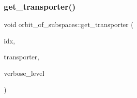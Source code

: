 \mbox{\label{classorbit__of__subspaces_a8a12bc95bd872bc86e026ea09b9dd396}} 
\subsubsection{\texorpdfstring{get\+\_\+transporter()}{get\_transporter()}}
{\footnotesize\ttfamily void orbit\+\_\+of\+\_\+subspaces\+::get\+\_\+transporter (\begin{DoxyParamCaption}\item[{\mbox{\hyperlink{galois_8h_a09fddde158a3a20bd2dcadb609de11dc}{I\+NT}}}]{idx,  }\item[{\mbox{\hyperlink{galois_8h_a09fddde158a3a20bd2dcadb609de11dc}{I\+NT}} $\ast$}]{transporter,  }\item[{\mbox{\hyperlink{galois_8h_a09fddde158a3a20bd2dcadb609de11dc}{I\+NT}}}]{verbose\+\_\+level }\end{DoxyParamCaption})}

\mbox{\label{classorbit__of__subspaces_ad4cdd9d8a409261fdbb6f81158bd7053}} 
